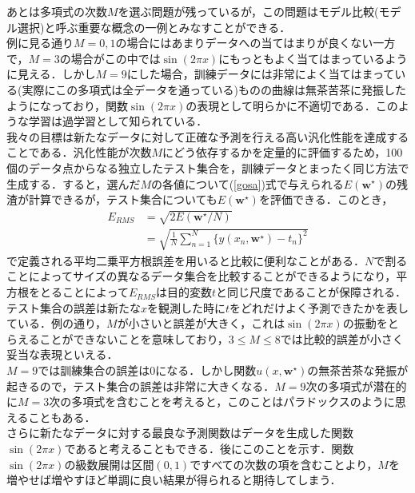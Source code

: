 \documentclass{jsarticle}
\theoremstyle{definition}
\begin{document}
あとは多項式の次数$M$を選ぶ問題が残っているが，この問題はモデル比較(モデル選択)と呼ぶ重要な概念の一例とみなすことができる．\\

例に見る通り$M=0,1$の場合にはあまりデータへの当てはまりが良くない一方で，$M=3$の場合がこの中では$\sin(2\pi x)$にもっともよく当てはまっているように見える．しかし$M=9$にした場合，訓練データには非常によく当てはまっている(実際にこの多項式は全データを通っている)ものの曲線は無茶苦茶に発振したようになっており，関数$\sin(2\pi x)$の表現として明らかに不適切である．このような学習は過学習として知られている．\\

我々の目標は新たなデータに対して正確な予測を行える高い汎化性能を達成することである．汎化性能が次数$M$にどう依存するかを定量的に評価するため，100個のデータ点からなる独立したテスト集合を，訓練データとまったく同じ方法で生成する．すると，選んだ$M$の各値について(\ref{gosa})式で与えられる$E(\bm w^{\star})$の残渣が計算できるが，テスト集合についても$E(\bm w^{\star})$を評価できる．このとき，
\begin{equation}
\begin{split}
  E_{RMS}&=\sqrt{2E(\bm w^{\star}/N)}\\
          &= \sqrt{\frac{1}{N}\sum_{n=1}^N \{y(x_n,\bm w^{\star}) - t_n\}^2}
\end{split}
\end{equation}
で定義される平均二乗平方根誤差を用いると比較に便利なことがある．$N$で割ることによってサイズの異なるデータ集合を比較することができるようになり，平方根をとることによって$E_{RMS}$は目的変数$t$と同じ尺度であることが保障される．テスト集合の誤差は新たな$x$を観測した時に$t$をどれだけよく予測できたかを表している．例の通り，$M$が小さいと誤差が大きく，これは$\sin(2\pi x)$の振動をとらえることができないことを意味しており，$3\leq M\leq 8$では比較的誤差が小さく妥当な表現といえる．\\

$M=9$では訓練集合の誤差は$0$になる．しかし関数$u(x,\bm w^{\star})$の無茶苦茶な発振が起きるので，テスト集合の誤差は非常に大きくなる．$M=9$次の多項式が潜在的に$M=3$次の多項式を含むことを考えると，このことはパラドックスのように思えることもある．\\
さらに新たなデータに対する最良な予測関数はデータを生成した関数$\sin (2\pi x)$であると考えることもできる．後にこのことを示す．関数$\sin (2\pi x)$の級数展開は区間$(0,1)$ですべての次数の項を含むことより，$M$を増やせば増やすほど単調に良い結果が得られると期待してしまう．\\
\end{document}
